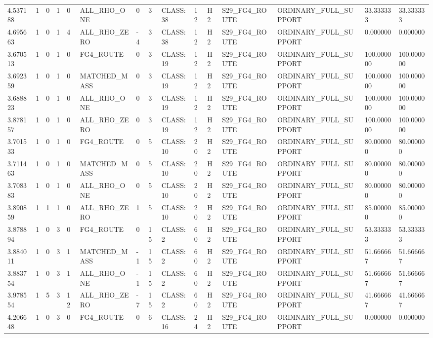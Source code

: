 \begin{tabular}{lllllllllllllll}
4.537188 & 1 & 0 & 1 & 0 & ALL\_RHO\_ONE & 0 & 3 & CLASS:38 & 12 & H2 & S29\_FG4\_ROUTE & ORDINARY\_FULL\_SUPPORT & 33.333333 & 33.333333 \\
4.695663 & 1 & 0 & 1 & 4 & ALL\_RHO\_ZERO & -4 & 3 & CLASS:38 & 12 & H2 & S29\_FG4\_ROUTE & ORDINARY\_FULL\_SUPPORT & 0.000000 & 0.000000 \\
3.670513 & 1 & 0 & 1 & 0 & FG4\_ROUTE & 0 & 3 & CLASS:19 & 12 & H2 & S29\_FG4\_ROUTE & ORDINARY\_FULL\_SUPPORT & 100.000000 & 100.000000 \\
3.692359 & 1 & 0 & 1 & 0 & MATCHED\_MASS & 0 & 3 & CLASS:19 & 12 & H2 & S29\_FG4\_ROUTE & ORDINARY\_FULL\_SUPPORT & 100.000000 & 100.000000 \\
3.688823 & 1 & 0 & 1 & 0 & ALL\_RHO\_ONE & 0 & 3 & CLASS:19 & 12 & H2 & S29\_FG4\_ROUTE & ORDINARY\_FULL\_SUPPORT & 100.000000 & 100.000000 \\
3.878157 & 1 & 0 & 1 & 0 & ALL\_RHO\_ZERO & 0 & 3 & CLASS:19 & 12 & H2 & S29\_FG4\_ROUTE & ORDINARY\_FULL\_SUPPORT & 100.000000 & 100.000000 \\
3.701533 & 1 & 0 & 1 & 0 & FG4\_ROUTE & 0 & 5 & CLASS:10 & 20 & H2 & S29\_FG4\_ROUTE & ORDINARY\_FULL\_SUPPORT & 80.000000 & 80.000000 \\
3.711463 & 1 & 0 & 1 & 0 & MATCHED\_MASS & 0 & 5 & CLASS:10 & 20 & H2 & S29\_FG4\_ROUTE & ORDINARY\_FULL\_SUPPORT & 80.000000 & 80.000000 \\
3.708383 & 1 & 0 & 1 & 0 & ALL\_RHO\_ONE & 0 & 5 & CLASS:10 & 20 & H2 & S29\_FG4\_ROUTE & ORDINARY\_FULL\_SUPPORT & 80.000000 & 80.000000 \\
3.890859 & 1 & 1 & 1 & 0 & ALL\_RHO\_ZERO & 1 & 5 & CLASS:10 & 20 & H2 & S29\_FG4\_ROUTE & ORDINARY\_FULL\_SUPPORT & 85.000000 & 85.000000 \\
3.878894 & 1 & 0 & 3 & 0 & FG4\_ROUTE & 0 & 15 & CLASS:2 & 60 & H2 & S29\_FG4\_ROUTE & ORDINARY\_FULL\_SUPPORT & 53.333333 & 53.333333 \\
3.884011 & 1 & 0 & 3 & 1 & MATCHED\_MASS & -1 & 15 & CLASS:2 & 60 & H2 & S29\_FG4\_ROUTE & ORDINARY\_FULL\_SUPPORT & 51.666667 & 51.666667 \\
3.883754 & 1 & 0 & 3 & 1 & ALL\_RHO\_ONE & -1 & 15 & CLASS:2 & 60 & H2 & S29\_FG4\_ROUTE & ORDINARY\_FULL\_SUPPORT & 51.666667 & 51.666667 \\
3.978554 & 1 & 5 & 3 & 12 & ALL\_RHO\_ZERO & -7 & 15 & CLASS:2 & 60 & H2 & S29\_FG4\_ROUTE & ORDINARY\_FULL\_SUPPORT & 41.666667 & 41.666667 \\
4.206648 & 1 & 0 & 3 & 0 & FG4\_ROUTE & 0 & 6 & CLASS:16 & 24 & H2 & S29\_FG4\_ROUTE & ORDINARY\_FULL\_SUPPORT & 0.000000 & 0.000000 \\

\end{tabular}

